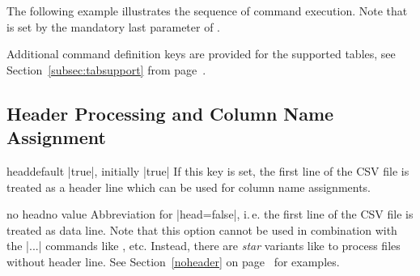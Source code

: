 \documentclass[a4paper,11pt]{ltxdoc}
\begin{document}
The following example illustrates the sequence of command execution.
Note that  is set by the mandatory last
parameter of .

\begin{dispExample}
%
\end{dispExample}

Additional command definition keys are provided for the supported tables,
see Section~\ref{subsec:tabsupport} from page~\pageref{subsec:tabsupport}.

\clearpage
\subsection{Header Processing and Column Name Assignment}%

\begin{docCsvKey}{head}{}{default |true|, initially |true|}
  If this key is set, the first line of the CSV file is treated as a header
  line which can be used for column name assignments.
\end{docCsvKey}


\begin{docCsvKey}{no head}{}{no value}
  Abbreviation for |head=false|, i.\,e. the first line of the CSV file is
  treated as data line.
  Note that this option cannot be used in combination with
  the |\csvauto...| commands like , etc.
  Instead, there are \emph{star} variants like  to
  process files without header line.
  See Section~\ref{noheader} on page~\pageref{noheader} for examples.
\end{docCsvKey}
\end{document}
